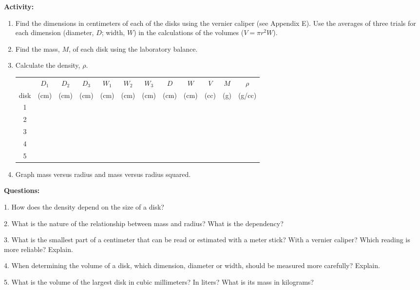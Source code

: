{\noindent \bf Activity:} \begin{enumerate}

\item Find the dimensions in centimeters of each of the disks using the vernier caliper (see Appendix E). Use the averages of three trials for each dimension (diameter, $D$; width, $W$) in the calculations of the volumes ($V = \pi r^2 W$).

\item Find the mass, $M$, of each disk using the laboratory balance.

\item Calculate the density, $\rho$.

\begin{center} \begin{tabular}{|c|c|c|c|c|c|c|c|c|c|c|c|} \hline \multicolumn{1}{|c||}{} & $D_1$ & $D_2$ & $D_3$ & $W_1$ & $W_2$ & $W_3$ & $D$ & $W$ & $V$ & $M$ & $\rho$\\ \multicolumn{1}{|c||}{disk} & (cm) & (cm) & (cm) & (cm) & (cm) & (cm) & (cm) & (cm) & (cc) & (g) & (g/cc) \\ \hline \hline \multicolumn{1}{|c||}{1} & & & & & & & & & & & \\ \hline \multicolumn{1}{|c||}{2} & & & & & & & & & & & \\ \hline \multicolumn{1}{|c||}{3} & & & & & & & & & & & \\ \hline \multicolumn{1}{|c||}{4} & & & & & & & & & & & \\ \hline \multicolumn{1}{|c||}{5} & & & & & & & & & & & \\ \hline \end{tabular} \end{center}

\item Graph mass versus radius and mass versus radius squared.

\end{enumerate}

\pagebreak

{\noindent \bf Questions:}

1. How does the density depend on the size of a disk? 
\vspace{20mm}

2. What is the nature of the relationship between mass and radius? What is the
dependency? 
\vspace{20mm}

3. What is the smallest part of a centimeter that can be read or estimated with
a meter stick? With a vernier caliper? Which reading is more reliable? Explain.
\vspace{20mm}

4. When determining the volume of a disk, which dimension, diameter or width,
should be measured more carefully? Explain. 
\vspace{20mm}

5. What is the volume of the largest disk in cubic millimeters? In liters? What
is its mass in kilograms?

